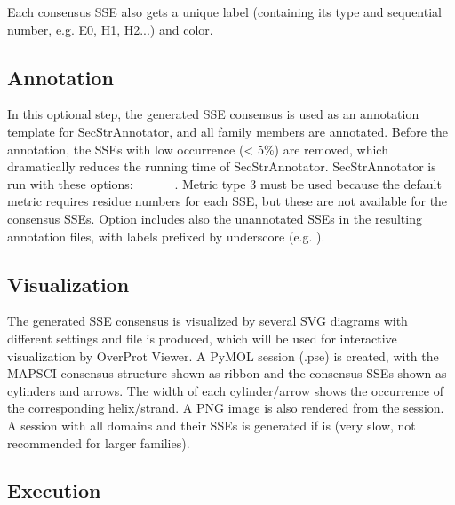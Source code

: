\documentclass{article}
\begin{document}
Each consensus SSE also gets a unique label (containing its type and sequential number, e.g. E0, H1, H2...) and color.



\subsection{Annotation}

In this optional step, the generated SSE consensus is used
as an annotation template for SecStrAnnotator, and all family members are
annotated. Before the annotation, the SSEs with low occurrence
(\textless{} 5\%) are removed, which dramatically reduces the running
time of SecStrAnnotator. SecStrAnnotator is run with these options:
 ~
~ ~
~. 
Metric type 3 must be used because the default metric requires 
residue numbers for each SSE, but these are not available for the consensus SSEs. 
Option  includes also the unannotated SSEs in the resulting annotation files, 
with labels prefixed by underscore (e.g. ).



\subsection{Visualization}

The generated SSE consensus is visualized by several SVG diagrams with
different settings and  file is produced, which
will be used for interactive visualization by OverProt Viewer. 
A PyMOL session (.pse) is created, with the MAPSCI consensus structure 
shown as ribbon and the consensus SSEs shown as cylinders and arrows.
The width of each cylinder/arrow shows the occurrence of the corresponding helix/strand.
A PNG image is also rendered from the session. 
A session with all domains and their SSEs is
generated if  is
 (very slow, not recommended for larger families).



\subsection{Execution}
\end{document}
